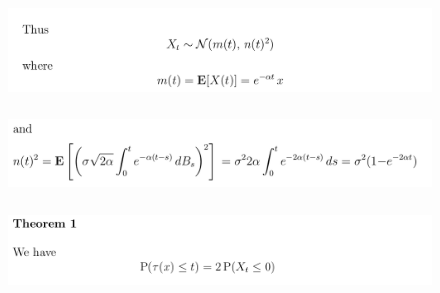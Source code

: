 \documentclass[c, dvipsnames, 8pt]{beamer}
\begin{document}
\begin{frame}[shrink=5]
	
	
	\frametitle{\insertsection} 
	\begin{figure}
		\centering
		\includegraphics[width=1\linewidth]{screenshot015}
		\label{fig:screenshot001}
	\end{figure}
	
		\frametitle{\insertsection} 
	\begin{figure}
		\centering
		\includegraphics[width=1\linewidth]{screenshot016}
		\label{fig:screenshot001}
	\end{figure}
	
	
		\frametitle{\insertsection} 
	\begin{figure}
		\centering
		\includegraphics[width=1\linewidth]{screenshot038}
		\label{fig:screenshot001}
	\end{figure}
	
	
	
	
	
	
\end{frame}
\end{document}
